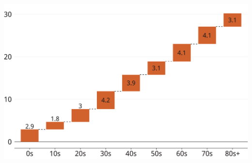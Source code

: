 \documentclass[tikz]{standalone}\usepackage[]{graphicx}\usepackage[]{color}
\newenvironment{knitrout}{}{} %
\begin{document}
\clearpage

\begin{knitrout}
\color{fgcolor}
\includegraphics[width=11.000in,height=7.00in]{./b5-figure/FISCAL-Figure13-pre-1} 

\end{knitrout}
\end{document}
